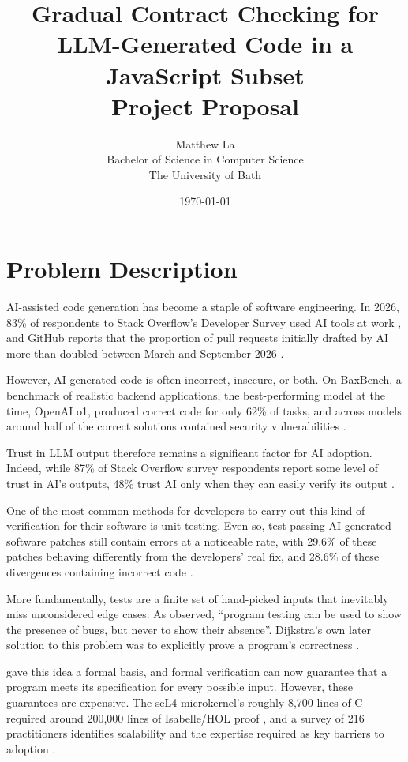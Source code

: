 \documentclass[11pt,a4paper,titlepage]{article}
\title{Gradual Contract Checking for LLM-Generated Code in a JavaScript Subset \\[1em] \large Project Proposal}
\author{Matthew La \\ Bachelor of Science in Computer Science \\ The University of Bath}
\date{\today}
\begin{document}
\maketitle
\tableofcontents

\newpage
{}

\section{Problem Description}

AI-assisted code generation has become a staple of software engineering. In 2026, 83\% of respondents to Stack Overflow's Developer Survey used AI tools at work \parencite{stackoverflow2026}, and GitHub reports that the proportion of pull requests initially drafted by AI more than doubled between March and September 2026 \parencite{github2026octoverse}.

However, AI-generated code is often incorrect, insecure, or both. On BaxBench, a benchmark of realistic backend applications, the best-performing model at the time, OpenAI o1, produced correct code for only 62\% of tasks, and across models around half of the correct solutions contained security vulnerabilities \parencite{vero2025baxbench}.

Trust in LLM output therefore remains a significant factor for AI adoption. Indeed, while 87\% of Stack Overflow survey respondents report some level of trust in AI's outputs, 48\% trust AI only when they can easily verify its output \parencite{stackoverflow2026}.

One of the most common methods for developers to carry out this kind of verification for their software is unit testing. Even so, test-passing AI-generated software patches still contain errors at a noticeable rate, with 29.6\% of these patches behaving differently from the developers' real fix, and 28.6\% of these divergences containing incorrect code \parencite{wang2025solvedissues}.

More fundamentally, tests are a finite set of hand-picked inputs that inevitably miss unconsidered edge cases. As \textcite[p.~7]{dijkstra1970notes} observed, ``program testing can be used to show the presence of bugs, but never to show their absence''. Dijkstra's own later solution to this problem was to explicitly prove a program's correctness \parencite{dijkstra1972humble}.

\textcite{hoare1969axiomatic} gave this idea a formal basis, and formal verification can now guarantee that a program meets its specification for every possible input. However, these guarantees are expensive. The seL4 microkernel's roughly 8,700 lines of C required around 200,000 lines of Isabelle/HOL proof \parencite{klein2009sel4}, and a survey of 216 practitioners identifies scalability and the expertise required as key barriers to adoption \parencite{gleirscher2020formal}.
\end{document}
